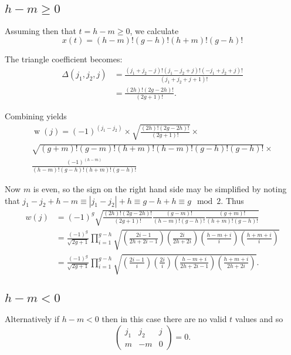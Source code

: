\documentclass[11pt]{article}
\newcommand{\symthreejarray}[6]{{\left( \begin{array}{ccc} #1 & #2 & #3 \\ #4 & #5 & #6 \end{array} \right)} }
\DeclareMathOperator{\threej}{w}
\begin{document}
\subsection{$h-m \ge 0$}
Assuming then that $t=h-m \ge 0$, we calculate
\begin{equation}
x(t) = (h-m)! (g-h)! (h+m)! (g-h)!
\end{equation}

The triangle coefficient becomes:
\begin{equation}
\begin{split}
\Delta(j_1,j_2,j) &= \frac{(j_1+j_2-j)! (j_1-j_2+j)! (-j_1 + j_2 +j)!}{(j_1+j_2+j + 1)!} \\
&= \frac{(2h)! (2g-2h)!}{(2g+1)!}.
\end{split}
\end{equation}

Combining yields
\begin{multline}
\threej(j) = (-1)^{(j_1-j_2)} \times \sqrt{\frac{(2h)! (2g-2h)!}{(2g+1)!}} \times \\
\sqrt{(g+m)!(g-m)!(h+m)!(h-m)!(g-h)!(g-h)!} \times \\
\frac{(-1)^{(h-m)}}{(h-m)! (g-h)! (h+m)! (g-h)!}
\end{multline}

Now $m$ is even, so the sign on the right hand side may be simplified by noting that $j_1 - j_2 + h - m \equiv |j_1 - j_2| + h \equiv g-h+h \equiv g \mod 2$. Thus
\begin{equation}
\begin{split}
w(j) &= (-1)^{g} \sqrt{\frac{(2h)!(2g-2h)!}{(2g+1)!} \frac{(g-m)!}{(h-m)!(g-h)!} \frac{(g+m)!}{(h+m)!(g-h)!}} \\
&=\frac{(-1)^{g}}{\sqrt{2g+1}} \prod_{i=1}^{g-h} \sqrt{\left(\frac{2i-1}{2h+2i-1}\right) \left(\frac{2i}{2h+2i}\right) \left(\frac{h-m+i}{i}\right) \left(\frac{h+m+i}{i}\right)} \\
&=\frac{(-1)^{g}}{\sqrt{2g+1}} \prod_{i=1}^{g-h} \sqrt{\left(\frac{2i-1}{i}\right) \left(\frac{2i}{i}\right) \left(\frac{h-m+i}{2h+2i-1}\right) \left(\frac{h+m+i}{2h+2i}\right)} .
\end{split}
\end{equation}

\subsection{$h-m < 0$}
Alternatively if $h-m < 0$ then in this case there are no valid $t$ values and so
\begin{equation}
\symthreejarray{j_1}{j_2}{j}{m}{-m}{0} = 0.
\end{equation}
\end{document}
